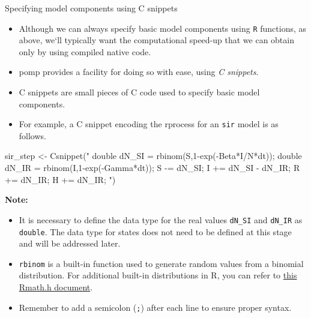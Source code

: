 \documentclass[
  ignorenonframetext,
  aspectratio=169,
  t]{beamer}
\newenvironment{Shaded}{\begin{snugshade}}{\end{snugshade}}
\newcommand{\FunctionTok}[1]{\textcolor[rgb]{0.28,0.35,0.67}{#1}}
\newcommand{\NormalTok}[1]{\textcolor[rgb]{0.00,0.23,0.31}{#1}}
\newcommand{\OtherTok}[1]{\textcolor[rgb]{0.00,0.23,0.31}{#1}}
\newcommand{\StringTok}[1]{\textcolor[rgb]{0.13,0.47,0.30}{#1}}
\providecommand{\tightlist}{%
  \setlength{\itemsep}{0pt}\setlength{\parskip}{0pt}}\usepackage{longtable,booktabs,array}
\theoremstyle{definition}
\begin{document}
\begin{frame}[fragile]{Specifying model components using C snippets}
\label{specifying-model-components-using-c-snippets}
\begin{itemize}
\item
  Although we can always specify basic model components using \texttt{R}
  functions, as above, we`ll typically want the computational speed-up
  that we can obtain only by using compiled native code.
\item
  pomp provides a facility for doing so with ease, using \emph{C
  snippets}.
\item
  C snippets are small pieces of C code used to specify basic model
  components.
\end{itemize}
\end{frame}

\begin{frame}[fragile]
\begin{itemize}
\tightlist
\item
  For example, a C snippet encoding the rprocess for an \texttt{sir}
  model is as follows.
\end{itemize}

\begin{Shaded}
\begin{Highlighting}[]
\NormalTok{    sir\_step }\OtherTok{\textless{}{-}} \FunctionTok{Csnippet}\NormalTok{(}\StringTok{"}
\StringTok{      double dN\_SI = rbinom(S,1{-}exp({-}Beta*I/N*dt));}
\StringTok{      double dN\_IR = rbinom(I,1{-}exp({-}Gamma*dt));}
\StringTok{      S {-}= dN\_SI;}
\StringTok{      I += dN\_SI {-} dN\_IR;}
\StringTok{      R += dN\_IR;}
\StringTok{      H += dN\_IR;}
\StringTok{    "}\NormalTok{)}
\end{Highlighting}
\end{Shaded}

\textbf{Note:}

\begin{itemize}
\item
  It is necessary to define the data type for the real values
  \texttt{dN\_SI} and \texttt{dN\_IR} as \texttt{double}. The data type
  for states does not need to be defined at this stage and will be
  addressed later.
\item
  \texttt{rbinom} is a built-in function used to generate random values
  from a binomial distribution. For additional built-in distributions in
  R, you can refer to
  \href{https://github.com/atks/Rmath/blob/master/Rmath/Rmath.h}{this
  Rmath.h document}.
\item
  Remember to add a semicolon (\texttt{;}) after each line to ensure
  proper syntax.
\end{itemize}
\end{frame}
\end{document}
